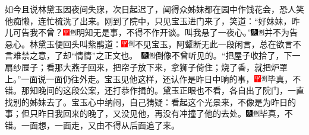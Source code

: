 如今且说林黛玉因夜间失寐，次日起迟了，闻得众姊妹都在园中作饯花会，恐人笑他痴懒，连忙梳洗了出来。刚到了院中，只见宝玉进门来了，笑道：“好妹妹，昨儿可告我不曾？{\includegraphics[width=3mm]{../Images/00002}\includegraphics[width=3mm]{../Images/00011}\footnotesize \kaishu 明知无是事，不得不作开谈。}叫我悬了一夜心。”{\includegraphics[width=3mm]{../Images/00004}\includegraphics[width=3mm]{../Images/00011}\footnotesize \kaishu 并不为告悬心。}林黛玉便回头叫紫鹃道：{\includegraphics[width=3mm]{../Images/00002}\includegraphics[width=3mm]{../Images/00011}\footnotesize \kaishu 不见宝玉，阿颦断无此一段闲言，总在欲言不言难禁之意，了却“情情”之正文也。　\includegraphics[width=3mm]{../Images/00004}\includegraphics[width=3mm]{../Images/00011}\footnotesize \kaishu 倒像不曾听见的。}“把屋子收拾了，下一扇纱屉子；看那大燕子回来，把帘子放下来，拿狮子倚住；烧了香，就把炉罩上。”一面说一面仍往外走。宝玉见他这样，还认作是昨日中晌的事，{\includegraphics[width=3mm]{../Images/00002}\includegraphics[width=3mm]{../Images/00011}\footnotesize \kaishu 毕真，不错。}那知晚间的这段公案，还打恭作揖的。黛玉正眼也不看，各自出了院门，一直找别的姊妹去了。宝玉心中纳闷，自己猜疑：看起这个光景来，不像是为昨日的事；但只昨日我回来的晚了，又没见他，再没有冲撞了他的去处。{\includegraphics[width=3mm]{../Images/00004}\includegraphics[width=3mm]{../Images/00011}\footnotesize \kaishu 毕真，不错。}一面想，一面走，又由不得从后面追了来。

